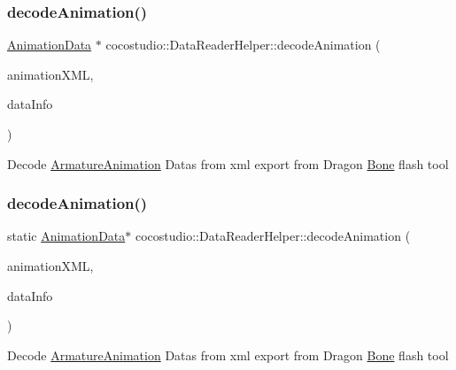 \subsubsection{\texorpdfstring{decode\+Animation()}{decodeAnimation()}\hspace{0.1cm}{\footnotesize\ttfamily [1/2]}}
{\footnotesize\ttfamily \hyperlink{classcocostudio_1_1AnimationData}{Animation\+Data} $\ast$ cocostudio\+::\+Data\+Reader\+Helper\+::decode\+Animation (\begin{DoxyParamCaption}\item[{\hyperlink{classtinyxml2_1_1XMLElement}{tinyxml2\+::\+X\+M\+L\+Element} $\ast$}]{animation\+X\+ML,  }\item[{\hyperlink{structcocostudio_1_1DataReaderHelper_1_1__DataInfo}{Data\+Info} $\ast$}]{data\+Info }\end{DoxyParamCaption})\hspace{0.3cm}{\ttfamily [static]}}

Decode \hyperlink{classcocostudio_1_1ArmatureAnimation}{Armature\+Animation} Datas from xml export from Dragon \hyperlink{classcocostudio_1_1Bone}{Bone} flash tool \mbox{\label{classcocostudio_1_1DataReaderHelper_ae29c3ee9c35b7ecff9b3898b657db568}} 
\subsubsection{\texorpdfstring{decode\+Animation()}{decodeAnimation()}\hspace{0.1cm}{\footnotesize\ttfamily [2/2]}}
{\footnotesize\ttfamily static \hyperlink{classcocostudio_1_1AnimationData}{Animation\+Data}$\ast$ cocostudio\+::\+Data\+Reader\+Helper\+::decode\+Animation (\begin{DoxyParamCaption}\item[{\hyperlink{classtinyxml2_1_1XMLElement}{tinyxml2\+::\+X\+M\+L\+Element} $\ast$}]{animation\+X\+ML,  }\item[{\hyperlink{structcocostudio_1_1DataReaderHelper_1_1__DataInfo}{Data\+Info} $\ast$}]{data\+Info }\end{DoxyParamCaption})\hspace{0.3cm}{\ttfamily [static]}}

Decode \hyperlink{classcocostudio_1_1ArmatureAnimation}{Armature\+Animation} Datas from xml export from Dragon \hyperlink{classcocostudio_1_1Bone}{Bone} flash tool \mbox{\label{classcocostudio_1_1DataReaderHelper_a2311ecf502f9ce3a68fd5b14315db775}} 

